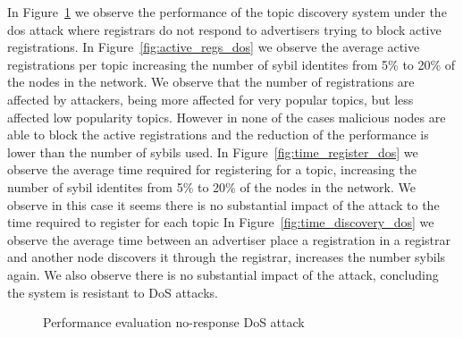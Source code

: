 In Figure~\ref{fig:perf_dos} we observe the performance of the topic discovery system under the dos attack where registrars do not respond to advertisers trying to block active registrations.
In Figure~\ref{fig:active_regs_dos} we observe the average active registrations per topic increasing the number of sybil identites from 5\% to 20\% of the nodes in the network.
We observe that the number of registrations are affected by attackers,  being more affected for very popular topics,  but less affected low popularity topics.  However in none of the cases malicious nodes are able to block the active registrations and the reduction of the performance is lower than the number of sybils used.
In Figure~\ref{fig:time_register_dos} we observe the average time required for registering for a topic,  increasing the number of sybil identites from 5\% to 20\% of the nodes in the network.
We observe in this case it seems there is no substantial impact of the attack to the time required to register for each topic
In Figure~\ref{fig:time_discovery_dos} we observe the average time between an advertiser place a registration in a registrar and another node discovers it through the registrar,  increases the number sybils again.
We also observe there is no substantial impact of the attack, concluding the system is resistant to DoS attacks.

\begin{figure}[!h]
\centering
{} 
\hspace{-0.16cm}
\label{fig:discovery_dos}
\hspace{-0.15in}
\label{fig:perf_dos}
\caption{Performance evaluation no-response DoS attack} 
\vspace{-0.15in}
\end{figure}   

\fi
%
